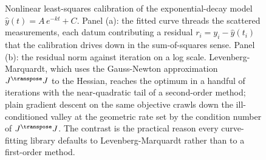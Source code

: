 \begin{figure}[ht]
\caption[Gauss-Newton calibration of a decay model]{Nonlinear
least-squares calibration of the exponential-decay model $\hat{y}(t)
= A\,e^{-kt} + C$. Panel (a): the fitted curve threads the scattered
measurements, each datum contributing a residual $r_{i} = y_{i} -
\hat{y}(t_{i})$ that the calibration drives down in the sum-of-squares
sense. Panel (b): the residual norm against iteration on a log scale.
Levenberg-Marquardt, which uses the Gauss-Newton approximation
$J^{\transpose}J$ to the Hessian, reaches the optimum in a handful of
iterations with the near-quadratic tail of a second-order method;
plain gradient descent on the same objective crawls down the
ill-conditioned valley at the geometric rate set by the condition
number of $J^{\transpose}J$. The contrast is the practical reason
every curve-fitting library defaults to Levenberg-Marquardt rather
than to a first-order method.}
\label{fig:vol02:ch15:gauss-newton-fit}
\end{figure}
